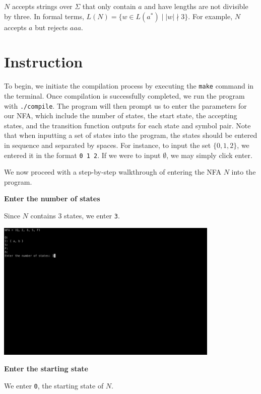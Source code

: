 \documentclass{article}
\begin{document}
$N$ accepts strings over $\Sigma$ that only contain $a$ and have lengths are not divisible by three. In formal terms, $L(N) = \{w \in L(a^*) \mid |w| \nmid 3\}$. For example, $N$ accepts $a$ but rejects $aaa$.

\section*{Instruction}


To begin, we initiate the compilation process by executing the \verb|make| command in the terminal. Once compilation is successfully completed, we run the program with \verb|./compile|. The program will then prompt us to enter the parameters for our NFA, which include the number of states, the start state, the accepting states, and the transition function outputs for each state and symbol pair. Note that when inputting a set of states into the program, the states should be entered in sequence and separated by spaces. For instance, to input the set $\{0, 1, 2\}$, we entered it in the format \verb|0 1 2|. If we were to input $\emptyset$, we may simply click enter.

We now proceed with a step-by-step walkthrough of entering the NFA $N$ into the program. 

\newpage

\textbf{\large Enter the number of states}

Since $N$ contains $3$ states, we enter \verb|3|.

\begin{center}
  \includegraphics[width=0.8\textwidth]{num}
\end{center}


\textbf{\large Enter the starting state}

We enter \verb|0|, the starting state of $N$.
\end{document}
